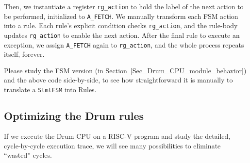 Then, we instantiate a register \verb|rg_action| to hold the label of
the next action to be performed, initialized to \verb|A_FETCH|.  We
manually transform each FSM action into a rule.  Each rule's explicit
condition checks \verb|rg_action|, and the rule-body updates
\verb|rg_action| to enable the next action.  After the final rule to
execute an exception, we assign \verb|A_FETCH| again to
\verb|rg_action|, and the whole process repeats itself, forever.


Please study the FSM version (in
Section~\ref{Sec_Drum_CPU_module_behavior}) and the above code
side-by-side, to see how straightforward it is manually to translate a
\verb|StmtFSM| into Rules.


\subsection{Optimizing the Drum rules}

If we execute the Drum CPU on a RISC-V program and study the detailed,
cycle-by-cycle execution trace, we will see many possibilities to
eliminate ``wasted'' cycles.

